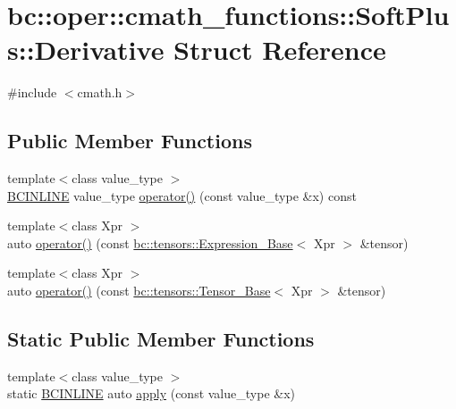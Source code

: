 \hypertarget{structbc_1_1oper_1_1cmath__functions_1_1SoftPlus_1_1Derivative}{}\section{bc\+:\+:oper\+:\+:cmath\+\_\+functions\+:\+:Soft\+Plus\+:\+:Derivative Struct Reference}
\label{structbc_1_1oper_1_1cmath__functions_1_1SoftPlus_1_1Derivative}


{\ttfamily \#include $<$cmath.\+h$>$}

\subsection*{Public Member Functions}
\begin{DoxyCompactItemize}
\item 
{\footnotesize template$<$class value\+\_\+type $>$ }\\\hyperlink{common_8h_a6699e8b0449da5c0fafb878e59c1d4b1}{B\+C\+I\+N\+L\+I\+NE} value\+\_\+type \hyperlink{structbc_1_1oper_1_1cmath__functions_1_1SoftPlus_1_1Derivative_a449bbe8797b2c7ab3ae4ee3bec439fdb}{operator()} (const value\+\_\+type \&x) const
\item 
{\footnotesize template$<$class Xpr $>$ }\\auto \hyperlink{structbc_1_1oper_1_1cmath__functions_1_1SoftPlus_1_1Derivative_a4643ee554049029c87d97ca5a4a98493}{operator()} (const \hyperlink{classbc_1_1tensors_1_1Expression__Base}{bc\+::tensors\+::\+Expression\+\_\+\+Base}$<$ Xpr $>$ \&tensor)
\item 
{\footnotesize template$<$class Xpr $>$ }\\auto \hyperlink{structbc_1_1oper_1_1cmath__functions_1_1SoftPlus_1_1Derivative_a54cab9bf8df0dbaf0a14b85b163a6cc5}{operator()} (const \hyperlink{classbc_1_1tensors_1_1Tensor__Base}{bc\+::tensors\+::\+Tensor\+\_\+\+Base}$<$ Xpr $>$ \&tensor)
\end{DoxyCompactItemize}
\subsection*{Static Public Member Functions}
\begin{DoxyCompactItemize}
\item 
{\footnotesize template$<$class value\+\_\+type $>$ }\\static \hyperlink{common_8h_a6699e8b0449da5c0fafb878e59c1d4b1}{B\+C\+I\+N\+L\+I\+NE} auto \hyperlink{structbc_1_1oper_1_1cmath__functions_1_1SoftPlus_1_1Derivative_a8f89af03961d09dd8d22d9c42a2ed922}{apply} (const value\+\_\+type \&x)
\end{DoxyCompactItemize}


